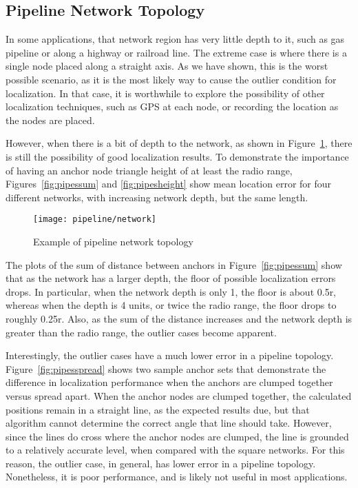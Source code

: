 \subsection{Pipeline Network Topology}

In some applications, that network region has very little depth to it, such as gas pipeline or along a highway or railroad line.  The extreme case is where there is a single node placed along a straight axis.  As we have shown, this is the worst possible scenario, as it is the most likely way to cause the outlier condition for localization.  In that case, it is worthwhile to explore the possibility of other localization techniques, such as GPS at each node, or recording the location as the nodes are placed.

However, when there is a bit of depth to the network, as shown in Figure~\ref{fig:pipeline}, there is still the possibility of good localization results.  To demonstrate the importance of having an anchor node triangle height of at least the radio range, Figures~\ref{fig:pipessum} and \ref{fig:pipesheight} show mean location error for four different networks, with increasing network depth, but the same length.  

\begin{figure}
  \centering
	\texttt{[image: pipeline/network]}
	\caption{Example of pipeline network topology}
	\label{fig:pipeline}
\end{figure}

The plots of the sum of distance between anchors in Figure~\ref{fig:pipessum} show that as the network has a larger depth, the floor of possible localization errors drops.  In particular, when the network depth is only 1, the floor is about 0.5r, whereas when the depth is 4 units, or twice the radio range, the floor drops to roughly 0.25r.  Also, as the sum of the distance increases and the network depth is greater than the radio range, the outlier cases become apparent.  

Interestingly, the outlier cases have a much lower error in a pipeline topology.  Figure~\ref{fig:pipesspread} shows two sample anchor sets that demonstrate the difference in localization performance when the anchors are clumped together versus spread apart.  When the anchor nodes are clumped together, the calculated positions remain in a straight line, as the expected results due, but that algorithm cannot determine the correct angle that line should take.  However, since the lines do cross where the anchor nodes are clumped, the line is grounded to a relatively accurate level, when compared with the square networks. For this reason, the outlier case, in general, has lower error in a pipeline topology. Nonetheless, it is poor performance, and is likely not useful in most applications.

